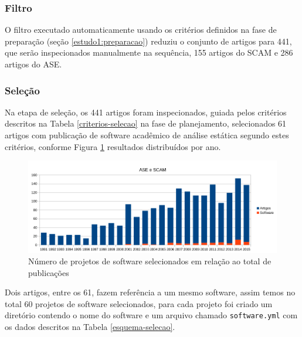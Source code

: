 \subsubsection{Filtro}


O filtro executado automaticamente usando os critérios definidos na fase de
preparação (seção \ref{estudo1:preparacao}) reduziu o conjunto de artigos para
441, que serão inspecionados manualmente na sequência,
155 artigos do SCAM e 286 artigos do ASE.

\subsubsection{Seleção}

Na etapa de seleção, os 441 artigos foram inspecionados, guiada pelos critérios
descritos na Tabela \ref{criterios-selecao} na fase de planejamento,
selecionados 61 artigos com publicação de software acadêmico de análise estática
segundo estes critérios, conforme Figura \ref{artigos-e-software-por-ano}
resultados distribuídos por ano.

\begin{figure}[h]
  \center
  \includegraphics[scale=0.65]{imagens/artigos-e-software-por-ano.png}
  \caption{Número de projetos de software selecionados em relação ao total de publicações}
  \label{artigos-e-software-por-ano}
\end{figure}

Dois artigos, entre os 61, fazem referência a um mesmo software, assim temos no
total 60 projetos de software selecionados, para cada projeto foi criado um
diretório contendo o nome do software e um arquivo chamado
\texttt{software.yml} com os dados descritos na Tabela \ref{esquema-selecao}.


